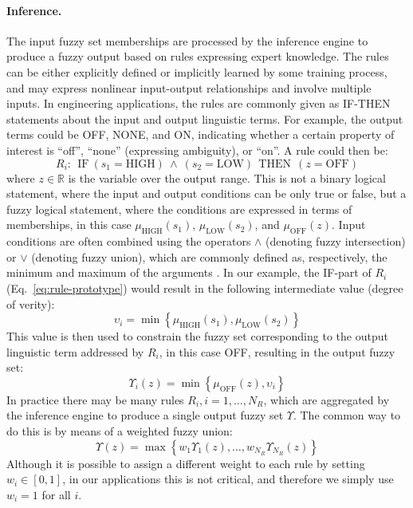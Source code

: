 \paragraph{Inference.} The input fuzzy set memberships are processed by the inference engine to produce a fuzzy output based on rules expressing expert knowledge. The rules can be either explicitly defined or implicitly learned by some training process, and may express nonlinear input-output relationships and involve multiple inputs. In engineering applications, the rules are commonly given as IF-THEN statements about the input and output linguistic terms. For example, the output terms could be OFF, NONE, and ON, indicating whether a certain property of interest is ``off'', ``none'' (expressing ambiguity), or ``on''. A rule could then be:%
\begin{equation}
R_{i} \! : \ \  \textrm{IF} \  (s_{1}=\textrm{HIGH})\ \wedge\ (s_{2}=\textrm{LOW})\ \ \textrm{THEN}\ \ (z=\textrm{OFF})
\label{eq:rule-prototype}
\end{equation}
where $z\in\mathbb{R}$ is the variable over the output range. This is not a binary logical statement, where the input and output conditions can be only true or false, but a fuzzy logical statement, where the conditions are expressed in terms of memberships, in this case $\mu_{\textrm{HIGH}}(s_{1})$, $\mu_{\textrm{LOW}}(s_{2})$, and $\mu_{\textrm{OFF}}(z)$. Input conditions are often combined using the operators $\wedge$ (denoting fuzzy intersection) or $\vee$ (denoting fuzzy union), which are commonly defined as, respectively, the minimum and maximum of the arguments \cite{mendel1995fuzzy}. In our example, the IF-part of $R_{i}$ (Eq.~\ref{eq:rule-prototype}) would result in the following intermediate value (degree of verity):
\begin{equation}
\upsilon_{i} = \min\left\{\mu_{\textrm{HIGH}}(s_{1}),\mu_{\textrm{LOW}}(s_{2})\right\}
\end{equation}
This value is then used to constrain the fuzzy set corresponding to the output linguistic term addressed by $R_{i}$, in this case OFF, resulting in the output fuzzy set:
\begin{equation}
\Upsilon_{\!i}(z) = \min\left\{\mu_{\textrm{OFF}}(z),\upsilon_{i}\right\}
\end{equation}
In practice there may be many rules $R_{i}, i=1,\dots,N_{R}$, which are aggregated by the inference engine to produce a single output fuzzy set $\Upsilon$. The common way to do this \cite{mendel1995fuzzy} is by means of a weighted fuzzy union:
\begin{equation}
\Upsilon(z) = \max\left\{w_{1}\Upsilon_{\!1}(z),\dots,w_{N_{R}}\Upsilon_{\!N_{R}}(z)\right\}
\end{equation}
Although it is possible to assign a different weight to each rule by setting $w_{i}\in[0,1]$, in our applications this is not critical, and therefore we simply use $w_{i}=1$ for all $i$.

